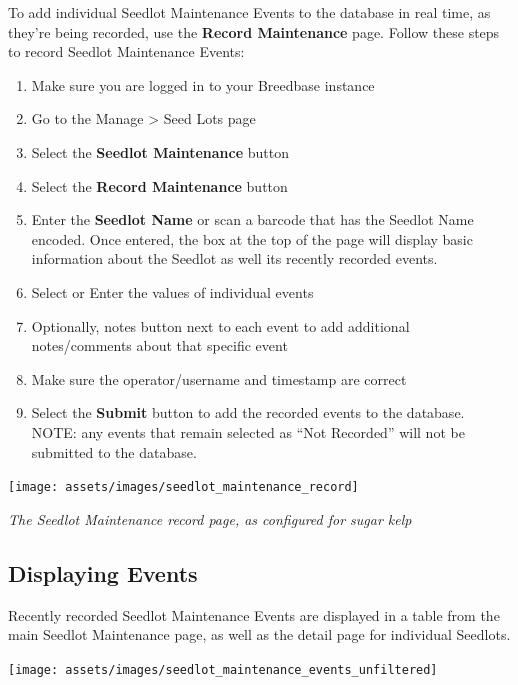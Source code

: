 \documentclass[
  12pt,
]{book}
\providecommand{\tightlist}{%
  \setlength{\itemsep}{0pt}\setlength{\parskip}{0pt}}
\begin{document}
To add individual Seedlot Maintenance Events to the database in real time, as they're being recorded, use the \textbf{Record Maintenance} page. Follow these steps to record Seedlot Maintenance Events:

\begin{enumerate}
\def\labelenumi{\arabic{enumi}.}
\tightlist
\item
  Make sure you are logged in to your Breedbase instance
\item
  Go to the Manage \textgreater{} Seed Lots page
\item
  Select the \textbf{Seedlot Maintenance} button
\item
  Select the \textbf{Record Maintenance} button
\item
  Enter the \textbf{Seedlot Name} or scan a barcode that has the Seedlot Name encoded. Once entered, the box at the top of the page will display basic information about the Seedlot as well its recently recorded events.
\item
  Select or Enter the values of individual events
\item
  Optionally, notes button next to each event to add additional notes/comments about that specific event
\item
  Make sure the operator/username and timestamp are correct
\item
  Select the \textbf{Submit} button to add the recorded events to the database. NOTE: any events that remain selected as ``Not Recorded'' will not be submitted to the database.
\end{enumerate}

\begin{center}\texttt{[image: assets/images/seedlot\_maintenance\_record]} \end{center}

\emph{The Seedlot Maintenance record page, as configured for sugar kelp}

\hypertarget{displaying-events}{%
\subsection{Displaying Events}\label{displaying-events}}

Recently recorded Seedlot Maintenance Events are displayed in a table from the main Seedlot Maintenance page, as well as the detail page for individual Seedlots.

\begin{center}\texttt{[image: assets/images/seedlot\_maintenance\_events\_unfiltered]} \end{center}
\end{document}
